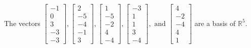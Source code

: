 \begin{exercise}
\begin{exerciseStatement}
  \end{exerciseStatement}
  \begin{exerciseAnswer}
   The vectors \(\left[\begin{array}{r}
-1 \\
0 \\
3 \\
-3 \\
-3
\end{array}\right] , \left[\begin{array}{r}
2 \\
-5 \\
-4 \\
-1 \\
3
\end{array}\right] , \left[\begin{array}{r}
1 \\
-5 \\
-2 \\
4 \\
-4
\end{array}\right] , \left[\begin{array}{r}
-3 \\
1 \\
1 \\
3 \\
-4
\end{array}\right] , \text{ and } \left[\begin{array}{r}
4 \\
-2 \\
-4 \\
4 \\
1
\end{array}\right]\) 
  	 are  a basis of \(\mathbb{R}^5\).
  


  \end{exerciseAnswer}
\end{exercise}